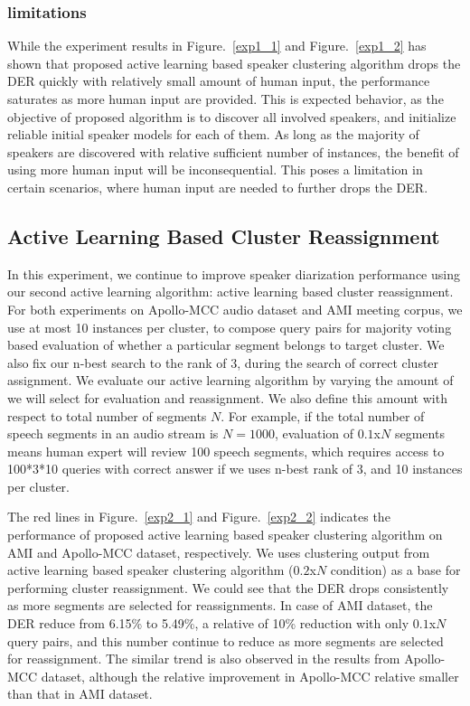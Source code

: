 \documentclass[journal]{IEEEtran}
\begin{document}
\subsubsection{limitations}
While the experiment results in Figure.~\ref{exp1_1} and Figure.~\ref{exp1_2} has shown that proposed active learning based speaker clustering algorithm drops the DER quickly with relatively small amount of human input, the performance saturates as more human input are provided. This is expected behavior, as the objective of proposed algorithm is to discover all involved speakers, and initialize reliable initial speaker models for each of them. As long as the majority of speakers are discovered with relative sufficient number of instances, the benefit of using more human input will be inconsequential. This poses a limitation in certain scenarios, where human input are needed to further drops the DER.

\subsection{Active Learning Based Cluster Reassignment}
In this experiment, we continue to improve speaker diarization performance using our second active learning algorithm: active learning based cluster reassignment. For both experiments on Apollo-MCC audio dataset and AMI meeting corpus, we use at most 10 instances per cluster, to compose query pairs for majority voting based evaluation of whether a particular segment belongs to target cluster. We also fix our n-best search to the rank of 3, during the search of correct cluster assignment. We evaluate our active learning algorithm by varying the amount of we will select for evaluation and reassignment. We also define this amount with respect to total number of segments $N$. For example, if the total number of speech segments in an audio stream is $N=1000$,  evaluation of $0.1$x$N$ segments means human expert will review 100 speech segments, which requires access to 100*3*10 queries with correct answer if we uses n-best rank of 3, and 10 instances per cluster.

The red lines in Figure.~\ref{exp2_1} and Figure.~\ref{exp2_2} indicates the performance of proposed active learning based speaker clustering algorithm on AMI and Apollo-MCC dataset, respectively. We uses clustering output from active learning based speaker clustering algorithm ($0.2$x$N$ condition) as a base for performing cluster reassignment. We could see that the DER drops consistently as more segments are selected for reassignments. In case of AMI dataset, the DER reduce from 6.15\% to 5.49\%, a relative of 10\% reduction with only $0.1$x$N$ query pairs, and this number continue to reduce as more segments are selected for reassignment. The similar trend is also observed in the results from Apollo-MCC dataset, although the relative improvement in Apollo-MCC relative smaller than that in AMI dataset.
\end{document}
